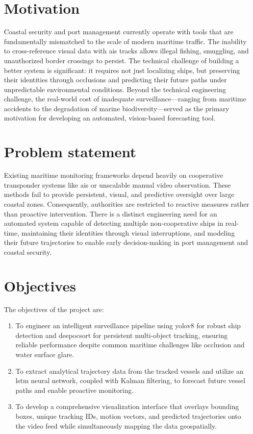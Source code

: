 \section[Motivation]{\textbf{Motivation}}
Coastal security and port management currently operate with tools that are fundamentally mismatched to the scale of modern maritime traffic. The inability to cross-reference visual data with \gls{ais} tracks allows illegal fishing, smuggling, and unauthorized border crossings to persist. The technical challenge of building a better system is significant: it requires not just localizing ships, but preserving their identities through occlusions and predicting their future paths under unpredictable environmental conditions. Beyond the technical engineering challenge, the real-world cost of inadequate surveillance---ranging from maritime accidents to the degradation of marine biodiversity---served as the primary motivation for developing an automated, vision-based forecasting tool.

\section[Problem statement]{\textbf{Problem statement}}
Existing maritime monitoring frameworks depend heavily on cooperative transponder systems like \gls{ais} or unscalable manual video observation. These methods fail to provide persistent, visual, and predictive oversight over large coastal zones. Consequently, authorities are restricted to reactive measures rather than proactive intervention. There is a distinct engineering need for an automated system capable of detecting multiple non-cooperative ships in real-time, maintaining their identities through visual interruptions, and modeling their future trajectories to enable early decision-making in port management and coastal security.

\section[Objectives]{\textbf{Objectives}}
The objectives of the project are:
\begin{enumerate}
\item To engineer an intelligent surveillance pipeline using \gls{yolov8} for robust ship detection and \gls{deepocsort} for persistent multi-object tracking, ensuring reliable performance despite common maritime challenges like occlusion and water surface glare.
\item To extract analytical trajectory data from the tracked vessels and utilize an \gls{lstm} neural network, coupled with Kalman filtering, to forecast future vessel paths and enable proactive monitoring.
\item To develop a comprehensive visualization interface that overlays bounding boxes, unique tracking IDs, motion vectors, and predicted trajectories onto the video feed while simultaneously mapping the data geospatially.
\end{enumerate}

